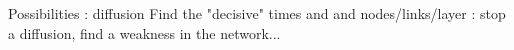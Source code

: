 \documentclass[15pt]{beamer}
\begin{document}
\begin{frame}{Possibilities : diffusion} %
Find the "decisive" times and and nodes/links/layer : stop a diffusion, find a weakness in the network...

\begin{figure}
	\centering
    \label{fig:chercheurs}	
\end{figure}
\end{frame}
\end{document}
